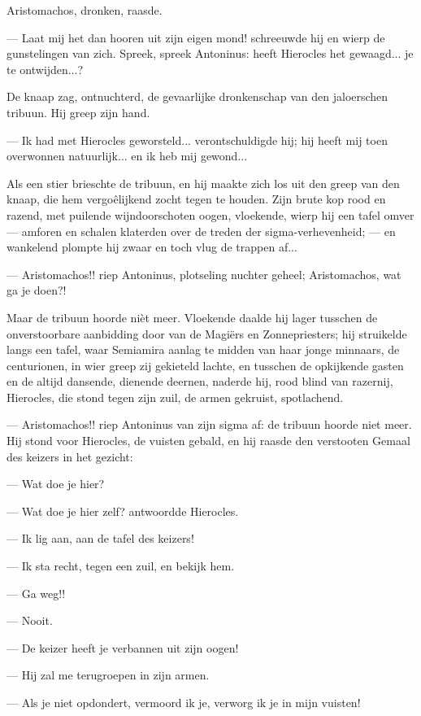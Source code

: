 \documentclass[a4paper, 12pt, oneside, dutch]{article}
\begin{document}
Aristomachos, dronken, raasde.

--- Laat mij het dan hooren uit zijn eigen mond! schreeuwde hij en wierp de gunstelingen van zich. Spreek, spreek Antoninus: heeft Hierocles het gewaagd... je te ontwijden...?

De knaap zag, ontnuchterd, de gevaarlijke dronkenschap van den jaloerschen tribuun. Hij greep zijn hand.

--- Ik had met Hierocles geworsteld... verontschuldigde hij; hij heeft mij toen overwonnen natuurlijk... en ik heb mij gewond...

Als een stier brieschte de tribuun, en hij maakte zich los uit den greep van den knaap, die hem vergoêlijkend zocht tegen te houden. Zijn brute kop rood en razend, met puilende wijndoorschoten oogen, vloekende, wierp hij een tafel omver --- amforen en schalen klaterden over de treden der sigma-verhevenheid; --- en wankelend plompte hij zwaar en toch vlug de trappen af...

--- Aristomachos!! riep Antoninus, plotseling nuchter geheel; Aristomachos, wat ga je doen?!

Maar de tribuun hoorde nièt meer. Vloekende daalde hij lager tusschen de onverstoorbare aanbidding door van de Magiërs en Zonnepriesters; hij struikelde langs een tafel, waar Semiamira aanlag te midden van haar jonge minnaars, de centurionen, in wier greep zij gekieteld lachte, en tusschen de opkijkende gasten en de altijd dansende, dienende deernen, naderde hij, rood blind van razernij, Hierocles, die stond tegen zijn zuil, de armen gekruist, spotlachend.

--- Aristomachos!! riep Antoninus van zijn sigma af: de tribuun hoorde niet meer. Hij stond voor Hierocles, de vuisten gebald, en hij raasde den verstooten Gemaal des keizers in het gezicht:

--- Wat doe je hier?

--- Wat doe je hier zelf? antwoordde Hierocles.

--- Ik lig aan, aan de tafel des keizers!

--- Ik sta recht, tegen een zuil, en bekijk hem.

--- Ga weg!!

--- Nooit.

--- De keizer heeft je verbannen uit zijn oogen!

--- Hij zal me terugroepen in zijn armen.

--- Als je niet opdondert, vermoord ik je, verworg ik je in mijn vuisten!
\end{document}
